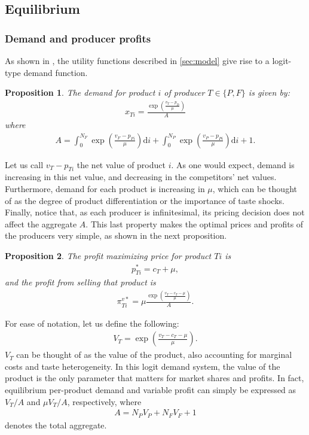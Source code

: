 \documentclass[a4paper]{article}
\newtheorem{proposition}{Proposition}
\newcommand{\di}{\mathrm{d}i}
\begin{document}
\subsection{Equilibrium}

\subsubsection{Demand and producer profits}

As shown in \textcite[]{anderson2021hybrid}, the utility functions described in \cref{sec:model} give rise to a logit-type demand function.
\begin{proposition}
    \label{prop:demand_function}
    The demand for product $i$ of producer $T \in \{P, F\}$ is given by:
    \begin{align*}
        x_{Ti} = \frac{\exp\left( \frac{v_T - p_{Ti}}{\mu} \right)}{A}
    \end{align*}
    where
    \begin{align}
        A = \int_0^{N_F} \exp\left( \frac{v_F - p_{Fi}}{\mu} \right) \di + \int_0^{N_P} \exp\left( \frac{v_P - p_{Pi}}{\mu} \right) \di + 1.
        \label{eq:aggregate}
    \end{align}
\end{proposition}

Let us call $v_T - p_{Ti}$ the net value of product $i$.
As one would expect, demand is increasing in this net value, and decreasing in the competitors' net values.
Furthermore, demand for each product is increasing in $\mu$, which can be thought of as the degree of product differentiation or the importance of taste shocks.
Finally, notice that, as each producer is infinitesimal, its pricing decision does not affect the aggregate $A$.
This last property makes the optimal prices and profits of the producers very simple, as shown in the next proposition.
\begin{proposition}
    \label{prop:optimal_profit}
    The profit maximizing price for product $Ti$ is
    \begin{align*}
        p^*_{Ti} = c_T + \mu,
    \end{align*}
    and the profit from selling that product is
    \begin{align}
        \pi^{v*}_{Ti} = \mu \frac{\exp \left( \frac{v_T - c_T - \mu}{\mu} \right)}{A}.
        \label{eq:optimal_profit}
    \end{align}
\end{proposition}

For ease of notation, let us define the following:
\begin{align*}
    V_T = \exp \left( \frac{v_T - c_T - \mu}{\mu} \right).
\end{align*}
$V_T$ can be thought of as the value of the product, also accounting for marginal costs and taste heterogeneity.
In this logit demand system, the value of the product is the only parameter that matters for market shares and profits.
In fact, equilibrium per-product demand and variable profit can simply be expressed as $V_T/ A$ and $\mu V_T/ A$, respectively, where
\begin{align*}
    A = N_P V_P + N_F V_F + 1
\end{align*}
denotes the total aggregate.
\end{document}
